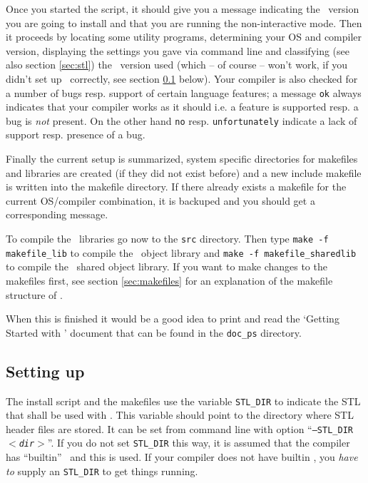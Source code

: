 Once you started the script, it should give you a message indicating
the \cgal\ version you are going to install and that you are running
the non-interactive mode. Then it proceeds by locating some utility
programs, determining your OS and compiler version, displaying the
settings you gave via command line and classifying (see also section
\ref{sec:stl}) the \stl\ version used (which -- of course -- won't
work, if you didn't set up \stl\ correctly, see section
\ref{sec:stl-setup} below). Your compiler is also checked for a number
of bugs resp. support of certain language features; a message
\texttt{ok} always indicates that your compiler works as it should
i.e. a feature is supported resp. a bug is \textit{not} present. On
the other hand \texttt{no} resp.  \texttt{unfortunately} indicate a
lack of support resp. presence of a bug.

Finally the current setup is summarized, system specific directories
for makefiles and libraries are created (if they did not exist before)
and a new include makefile is written into the makefile directory. If
there already exists a makefile for the current OS/compiler
combination, it is backuped and you should get a corresponding
message.

To compile the \cgal\ libraries go now to the \texttt{src} directory.
Then type \texttt{make -f makefile\_lib} to compile the \cgal\ object
library and \texttt{make -f makefile\_sharedlib} to compile the \cgal\ 
shared object library. If you want to make changes to the makefiles
first, see section \ref{sec:makefiles} for an explanation of the
makefile structure of \cgal.

When this is finished it would be a good idea to print and read the
`Getting Started with \cgal' document that can be found in the
\texttt{doc\_ps} directory.

\subsection{Setting up \stl}\label{sec:stl-setup}

The install script and the makefiles use the variable
\texttt{STL\_DIR} to indicate the STL that shall be used with \cgal.
This variable should point to the directory where STL header files are
stored. It can be set from command line with option
``\texttt{--STL\_DIR \textit{$<$dir$>$}}''. If you do not set
\texttt{STL\_DIR} this way, it is assumed that the compiler has
``builtin'' \stl\ and this is used. If your compiler does not have
builtin \stl, you \textit{have to} supply an \texttt{STL\_DIR} to get
things running.

